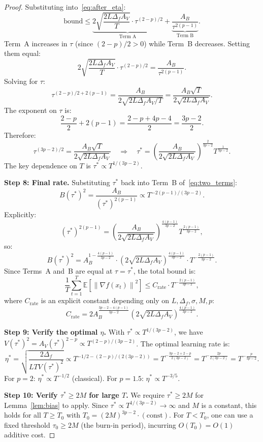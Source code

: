 \documentclass[11pt]{article}
\theoremstyle{definition}
\newcommand{\E}{\mathbb{E}}
\newcommand{\norm}[1]{\left\| #1 \right\|}
\begin{document}
\begin{proof}
Substituting into~\eqref{eq:after_eta}:
\begin{equation}\label{eq:two_terms}
  \text{bound} \leq
  \underbrace{2\sqrt{\frac{2L\Delta_f A_V}{T}} \cdot \tau^{(2-p)/2}}_{\text{Term A}}
  + \underbrace{\frac{A_B}{\tau^{2(p-1)}}}_{\text{Term B}}.
\end{equation}
Term~A increases in $\tau$ (since $(2-p)/2 > 0$) while Term~B decreases.
Setting them equal:
\[
  2\sqrt{\frac{2L\Delta_f A_V}{T}} \cdot \tau^{(2-p)/2}
  = \frac{A_B}{\tau^{2(p-1)}}.
\]
Solving for $\tau$:
\[
  \tau^{(2-p)/2 + 2(p-1)} = \frac{A_B}{2\sqrt{2L\Delta_f A_V/T}}
  = \frac{A_B \sqrt{T}}{2\sqrt{2L\Delta_f A_V}}.
\]
The exponent on $\tau$ is:
\[
  \frac{2-p}{2} + 2(p-1) = \frac{2 - p + 4p - 4}{2} = \frac{3p - 2}{2}.
\]
Therefore:
\begin{equation}\label{eq:tau_opt}
  \tau^{(3p-2)/2} = \frac{A_B\sqrt{T}}{2\sqrt{2L\Delta_f A_V}}
  \quad\Longrightarrow\quad
  \tau^* = \left(\frac{A_B}{2\sqrt{2L\Delta_f A_V}}\right)^{\frac{2}{3p-2}}
    T^{\frac{1}{3p-2}}.
\end{equation}
The key dependence on $T$ is $\tau^* \propto T^{1/(3p-2)}$.

\medskip
\textbf{Step 8: Final rate.}
Substituting $\tau^*$ back into Term~B of~\eqref{eq:two_terms}:
\[
  B(\tau^*)^2 = \frac{A_B}{(\tau^*)^{2(p-1)}} \propto T^{-2(p-1)/(3p-2)}.
\]
Explicitly:
\[
  (\tau^*)^{2(p-1)} = \left(\frac{A_B}{2\sqrt{2L\Delta_f A_V}}\right)^{\frac{4(p-1)}{3p-2}}
    T^{\frac{2(p-1)}{3p-2}},
\]
so:
\begin{equation}
  B(\tau^*)^2 = A_B^{1 - \frac{4(p-1)}{3p-2}} \cdot
    \left(2\sqrt{2L\Delta_f A_V}\right)^{\frac{4(p-1)}{3p-2}}
    \cdot T^{-\frac{2(p-1)}{3p-2}}.
\end{equation}
Since Terms~A and~B are equal at $\tau = \tau^*$, the total bound is:
\begin{equation}\label{eq:final_rate}
  \frac{1}{T}\sum_{t=1}^{T}\E\!\left[\norm{\nabla f(x_t)}^2\right]
  \leq C_{\mathrm{rate}} \cdot T^{-\frac{2(p-1)}{3p-2}},
\end{equation}
where $C_{\mathrm{rate}}$ is an explicit constant depending only on
$L, \Delta_f, \sigma, M, p$:
\[
  C_{\mathrm{rate}} = 2 A_B^{\frac{3p - 2 - 4(p-1)}{3p-2}}
    \left(2\sqrt{2L\Delta_f A_V}\right)^{\frac{4(p-1)}{3p-2}}.
\]

\medskip
\textbf{Step 9: Verify the optimal $\eta$.}
With $\tau^* \propto T^{1/(3p-2)}$, we have $V(\tau^*)^2 = A_V (\tau^*)^{2-p}
\propto T^{(2-p)/(3p-2)}$. The optimal learning rate is:
\[
  \eta^* = \sqrt{\frac{2\Delta_f}{LT V(\tau^*)^2}}
  \propto T^{-1/2 - (2-p)/(2(3p-2))}
  = T^{-\frac{3p-2+2-p}{2(3p-2)}}
  = T^{-\frac{2p}{2(3p-2)}}
  = T^{-\frac{p}{3p-2}}.
\]
For $p = 2$: $\eta^* \propto T^{-1/2}$ (classical). For $p = 1.5$:
$\eta^* \propto T^{-3/5}$.

\medskip
\textbf{Step 10: Verify $\tau^* \geq 2M$ for large $T$.}
We require $\tau^* \geq 2M$ for Lemma~\ref{lem:bias} to apply.
Since $\tau^* \propto T^{1/(3p-2)} \to \infty$ and $M$ is a constant,
this holds for all $T \geq T_0$ with $T_0 = (2M)^{3p-2} \cdot (\text{const})$.
For $T < T_0$, one can use a fixed threshold $\tau_0 \geq 2M$ (the burn-in
period), incurring $O(T_0) = O(1)$ additive cost.
\end{proof}
\end{document}
